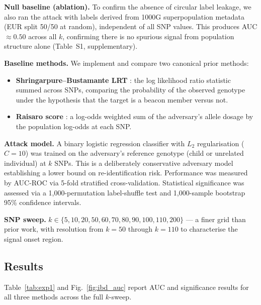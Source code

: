 \documentclass[conference]{IEEEtran}
\begin{document}
\textbf{Null baseline (ablation).}
To confirm the absence of circular label leakage, we also ran the attack with
labels derived from 1000G superpopulation metadata (EUR split 50/50 at random),
independent of all SNP values. This produces AUC $\approx 0.50$ across all
$k$, confirming there is no spurious signal from population structure alone
(Table~S1, supplementary).

\textbf{Baseline methods.}
We implement and compare two canonical prior methods:
\begin{itemize}
    \item \textbf{Shringarpure--Bustamante LRT} \cite{shringarpure2015}: the
    log likelihood ratio statistic summed across SNPs, comparing the probability
    of the observed genotype under the hypothesis that the target is a beacon
    member versus not.
    \item \textbf{Raisaro score} \cite{raisaro2017}: a log-odds weighted sum
    of the adversary's allele dosage by the population log-odds at each SNP.
\end{itemize}

\textbf{Attack model.} A binary logistic regression classifier with $L_2$
regularisation ($C=10$) was trained on the adversary's reference genotype
(child or unrelated individual) at $k$ SNPs. This is a deliberately
conservative adversary model establishing a lower bound on re-identification
risk. Performance was measured by AUC-ROC via 5-fold stratified
cross-validation. Statistical significance was assessed via a 1,000-permutation
label-shuffle test and 1,000-sample bootstrap 95\% confidence intervals.

\textbf{SNP sweep.} $k\in\{5,10,20,50,60,70,80,90,100,110,200\}$ --- a finer
grid than prior work, with resolution from $k=50$ through $k=110$ to
characterise the signal onset region.

\subsection{Results}

Table~\ref{tab:exp1} and Fig.~\ref{fig:ibd_auc} report AUC and significance
results for all three methods across the full $k$-sweep.
\end{document}
